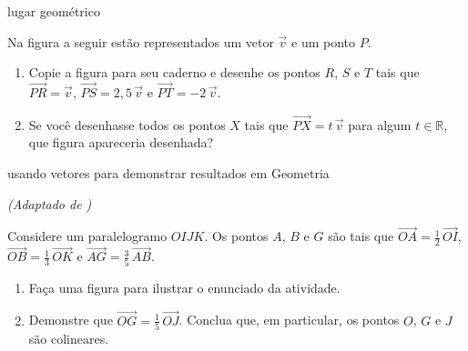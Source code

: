 \begin{task}{ lugar geométrico}



Na figura a seguir estão representados um vetor \(\vec{v}\) e um ponto \(P\).
\begin{center}\end{center}\begin{enumerate}
\item {} 
Copie a figura para seu caderno e desenhe os pontos \(R\), \(S\) e \(T\) tais que \(\overrightarrow{PR} = \vec{v}\), \(\overrightarrow{PS} = 2{,}5 \, \vec{v}\) e \(\overrightarrow{PT} = -2 \, \vec{v}\).

\item {} 
Se você desenhasse todos os pontos \(X\) tais que \(\overrightarrow{PX} = t \, \vec{v}\) para algum \(t \in {\mathbb R}\), que figura apareceria desenhada?

\end{enumerate}
\end{task}

\begin{task}{ usando vetores para demonstrar resultados em Geometria}

\textit{(Adaptado de \citet[p. 219]{sesamath2014}) }

Considere um paralelogramo \(OIJK\). Os pontos \(A\), \(B\) e \(G\) são tais que \(\overrightarrow{OA} = \frac{1}{2} \, \overrightarrow{OI}\), \(\overrightarrow{OB} = \frac{1}{3} \, \overrightarrow{OK}\) e \(\overrightarrow{AG} = \frac{3}{5} \, \overrightarrow{AB}\).
\begin{enumerate}
\item {} 
Faça uma figura para ilustrar o enunciado da atividade.

\item {} 
Demonstre que \(\overrightarrow{OG} = \frac{1}{5} \, \overrightarrow{OJ}\). Conclua que, em particular, os pontos \(O\), \(G\) e \(J\) são colineares.

\end{enumerate}
\end{task}


